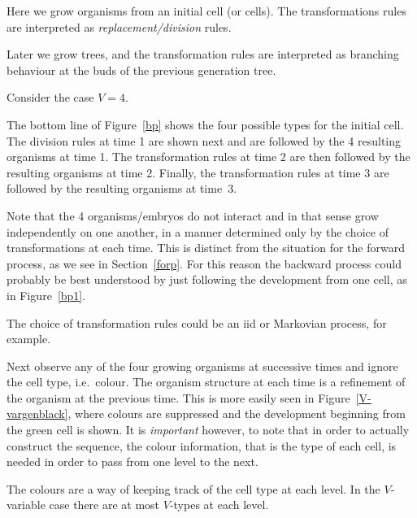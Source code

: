 \documentclass[a4paper]{amsart}
\begin{document}
 
\medskip  Here we grow organisms from an initial cell (or cells). The transformations rules are interpreted as \emph{replacement/division}   rules. 

Later we grow trees, and the transformation rules are interpreted as branching behaviour at the buds of the previous generation tree.
   
\bigskip Consider the case $ V=4 $. 

The bottom line of Figure~\ref{bp} shows the four possible types for the initial cell.  The   division rules at time 1 are shown next and  are followed by the 4 resulting organisms at time 1.  The transformation rules at time 2 are then followed by the resulting organisms at time 2.  Finally, the transformation rules at time 3 are followed by the resulting organisms at time~3. 
   
   Note that the 4 organisms/embryos do not interact and in that sense grow  independently on one another, in a manner determined only by the choice of transformations at each time.   This is distinct from the situation for the forward process, as we see in Section~\ref{forp}.   For this reason the backward process could probably be  best understood by just following the development from one cell, as in Figure~\ref{bp1}. 
   
   
\medskip     The choice of transformation rules could be an iid or Markovian process, for example. 

\medskip Next observe any of the four  growing organisms at successive times and ignore the cell type, i.e.\ colour. 
 The organism structure at each time is a refinement  of the organism at the previous time.  This is more easily seen in Figure~\ref{V-vargenblack}, where colours are suppressed and the development beginning from the green cell is shown. It is \emph{important} however, to note that in order to actually construct the sequence, the colour information, that is the type of each cell, is needed in order to pass from one level to the next.
 
 The colours are a way of keeping track of the cell type at each level.  In the $ V $-variable case there are at most $ V $-types at each level.
  
\end{document}
